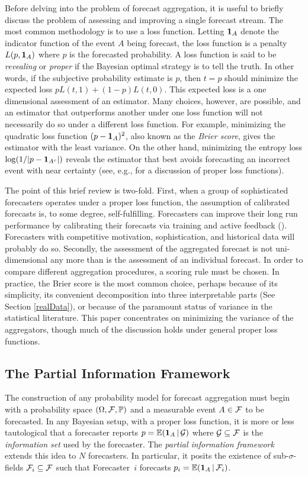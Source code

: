 \documentclass[11pt]{article}
\renewcommand{\P}{\mathbb{P}}
\newcommand{\E}{\mathbb{E}}
\theoremstyle{definition}
\theoremstyle{definition}
\def\one{{\bf 1}}
\def\F{{\cal F}}
\def\G{{\cal G}}
\def\P{{\mathbb P}}
\def\E{{\mathbb E}}
\def\|{\, | \,}
\begin{document}
Before delving into the problem of forecast aggregation, it is useful
to briefly discuss the problem of assessing and improving a single
forecast stream.  The most common methodology is to use a loss
function.  Letting $\one_A$ denote the indicator function of the event
$A$ being forecast, the loss function is a penalty $L(p , \one_A)$
where $p$ is the forecasted probability.  A loss function is said to
be {\em revealing} or {\em proper} if the Bayesian optimal strategy is
to tell the truth.  In other words, if the subjective probability
estimate is $p$, then $t = p$ should minimize the expected loss $p
L(t,1) + (1-p) L(t,0)$.  This expected loss is a one dimensional
assessment of an estimator. Many choices, however, are possible, and
an estimator that outperforms another under one loss function will not
necessarily do so under a different loss function.  For example,
minimizing the quadratic loss function $(p - \one_A)^2$, also known as
the {\em Brier score}, gives the estimator with the least variance. On
the other hand, minimizing the entropy loss $\log (1 / |p -
\one_{A^c}|)$ reveals the estimator that best avoids forecasting an
incorrect event with near certainty (see, e.g., \citealt[Section~2]{HwPe1997}
for a discussion of proper loss functions).

The point of this brief review is two-fold.  First, when a group of
sophisticated forecasters operates under a proper loss function,
the assumption of calibrated forecasts is, to some degree,
self-fulfilling.  Forecasters can improve their long run performance
by calibrating their forecasts via training and active
feedback (\citealt{o2006uncertain}). Forecasters with competitive
motivation, sophistication, and historical data will probably do so. Secondly, the
assessment of the aggregated forecast is not uni-dimensional any more
than is the assessment of an individual forecast.  In order to compare
different aggregation procedures, a scoring rule must be chosen.  In
practice, the Brier score is the most common choice, perhaps because
of its simplicity, its convenient decomposition into three
interpretable parts (See Section \ref{realData}), or because of the
paramount status of variance in the statistical literature. This paper concentrates on minimizing the variance of the aggregators, though
 much of the discussion holds under general proper loss
functions.

\subsection{The Partial Information Framework}
\label{PIFintro}
The construction of any probability model for forecast aggregation
must begin with a probability space $(\Omega, \F , \P)$ and a
measurable event $A \in \F$ to be forecasted.  In any Bayesian setup,
with a proper loss function, it is more or less tautological that a
forecaster reports $p = \E (\one_A \| \G)$ where $\G \subseteq \F$ is
the \textit{information set} used by the forecaster.  The
\textit{partial information framework} extends this idea to $N$
forecasters. In particular, it posits the existence of
sub-$\sigma$-fields $\F_i \subseteq \F$ such that Forecaster~$i$
forecasts $p_i = \E (\one_A \| \F_i)$.
\end{document}
